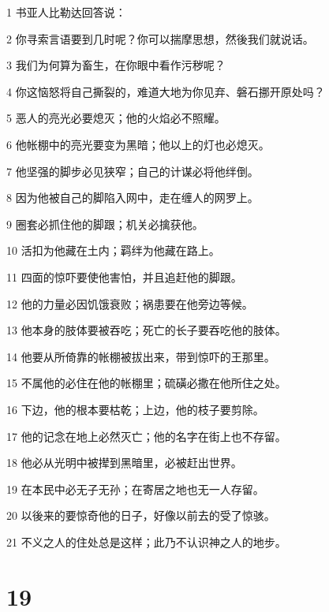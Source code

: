 \par 1 书亚人比勒达回答说：
\par 2 你寻索言语要到几时呢？你可以揣摩思想，然後我们就说话。
\par 3 我们为何算为畜生，在你眼中看作污秽呢？
\par 4 你这恼怒将自己撕裂的，难道大地为你见弃、磐石挪开原处吗？
\par 5 恶人的亮光必要熄灭；他的火焰必不照耀。
\par 6 他帐棚中的亮光要变为黑暗；他以上的灯也必熄灭。
\par 7 他坚强的脚步必见狭窄；自己的计谋必将他绊倒。
\par 8 因为他被自己的脚陷入网中，走在缠人的网罗上。
\par 9 圈套必抓住他的脚跟；机关必擒获他。
\par 10 活扣为他藏在土内；羁绊为他藏在路上。
\par 11 四面的惊吓要使他害怕，并且追赶他的脚跟。
\par 12 他的力量必因饥饿衰败；祸患要在他旁边等候。
\par 13 他本身的肢体要被吞吃；死亡的长子要吞吃他的肢体。
\par 14 他要从所倚靠的帐棚被拔出来，带到惊吓的王那里。
\par 15 不属他的必住在他的帐棚里；硫磺必撒在他所住之处。
\par 16 下边，他的根本要枯乾；上边，他的枝子要剪除。
\par 17 他的记念在地上必然灭亡；他的名字在街上也不存留。
\par 18 他必从光明中被撵到黑暗里，必被赶出世界。
\par 19 在本民中必无子无孙；在寄居之地也无一人存留。
\par 20 以後来的要惊奇他的日子，好像以前去的受了惊骇。
\par 21 不义之人的住处总是这样；此乃不认识神之人的地步。

\chapter{19}

